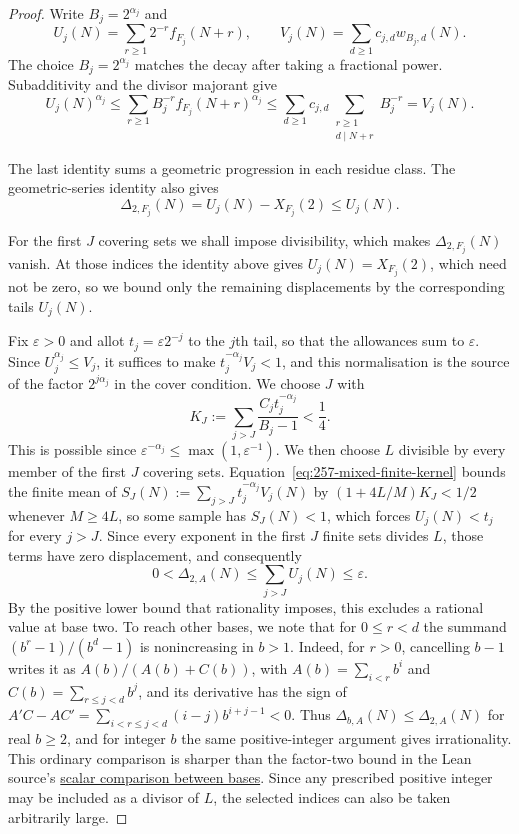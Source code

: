 \begin{proof}
Write $B_j=2^{\alpha_j}$ and
\[
 U_j(N)=\sum_{r\ge1}2^{-r}f_{F_j}(N+r),\qquad
 V_j(N)=\sum_{d\ge1}c_{j,d}w_{B_j,d}(N).
\]
The choice $B_j=2^{\alpha_j}$ matches the decay after taking a
fractional power.  Subadditivity and the divisor majorant give
\[
 U_j(N)^{\alpha_j}
 \le\sum_{r\ge1}B_j^{-r}f_{F_j}(N+r)^{\alpha_j}
 \le\sum_{d\ge1}c_{j,d}
       \sum_{\substack{r\ge1\\d\mid N+r}}B_j^{-r}
 =V_j(N).
\]
\par\noindent
\begin{minipage}{\linewidth}
The last identity sums a geometric progression in each residue class.
The geometric-series identity also gives
\[
 \Delta_{2,F_j}(N)=U_j(N)-X_{F_j}(2)\le U_j(N).
\]
\end{minipage}
\par
For the first $J$ covering sets we shall impose divisibility, which makes
$\Delta_{2,F_j}(N)$ vanish. At those indices the identity above gives
$U_j(N)=X_{F_j}(2)$, which need not be zero, so we bound only the
remaining displacements by the corresponding tails $U_j(N)$.

Fix $\varepsilon>0$ and allot $t_j=\varepsilon2^{-j}$ to the $j$th tail,
so that the allowances sum to $\varepsilon$. Since
$U_j^{\alpha_j}\le V_j$, it suffices to make $t_j^{-\alpha_j}V_j<1$, and
this normalisation is the source of the factor $2^{j\alpha_j}$ in the
cover condition. We choose $J$ with
\[
 K_J:=\sum_{j>J}\frac{C_jt_j^{-\alpha_j}}{B_j-1}<\frac14.
\]
This is possible since $\varepsilon^{-\alpha_j}\le\max(1,\varepsilon^{-1})$.
We then choose $L$ divisible by every member of the first $J$ covering
sets. Equation~\eqref{eq:257-mixed-finite-kernel} bounds the finite mean
of $S_J(N):=\sum_{j>J}t_j^{-\alpha_j}V_j(N)$ by $(1+4L/M)K_J<1/2$
whenever $M\ge4L$, so some sample has $S_J(N)<1$, which forces
$U_j(N)<t_j$ for every $j>J$. Since every exponent in the first $J$
finite sets divides $L$, those terms have zero displacement, and
consequently
\[
 0<\Delta_{2,A}(N)\le\sum_{j>J}U_j(N)\le\varepsilon.
\]
By the positive lower bound that rationality imposes, this excludes a
rational value at base two. To reach other bases, we note that for
$0\le r<d$ the summand $(b^r-1)/(b^d-1)$ is nonincreasing in $b>1$.
Indeed, for $r>0$, cancelling $b-1$ writes it as $A(b)/(A(b)+C(b))$,
with $A(b)=\sum_{i<r}b^i$ and $C(b)=\sum_{r\le j<d}b^j$, and its
derivative has the sign of $A'C-AC'=\sum_{i<r\le j<d}(i-j)b^{i+j-1}<0$.
Thus $\Delta_{b,A}(N)\le\Delta_{2,A}(N)$ for real $b\ge2$, and for
integer $b$ the same positive-integer argument gives irrationality.
This ordinary comparison is sharper than the factor-two bound in the
Lean source's
\href{https://github.com/wcook04/plectis-erdos-lean/blob/52f29ad173b04e3bac941b3663f2b9aebe5de0bb/ErdosProblems/Erdos257/PaperCompleteR7/CoverKernel.lean#L232}{scalar comparison between bases}.
Since any prescribed positive integer may be included as a divisor of
$L$, the selected indices can also be taken arbitrarily large.
\end{proof}

